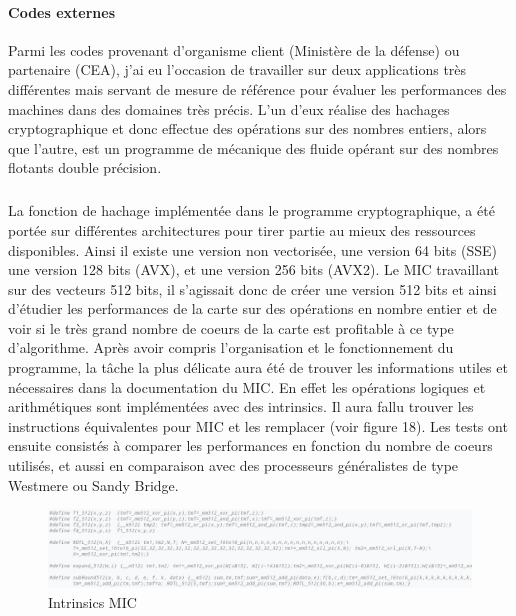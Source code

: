 \documentclass{article}
\begin{document}
				\paragraph{Codes externes}
				Parmi les codes provenant d'organisme client (Ministère de la défense) ou partenaire (CEA), j'ai eu l'occasion 
				de travailler sur deux applications très différentes mais servant de mesure de référence pour évaluer les 
				performances des machines dans des domaines très précis. L'un d'eux réalise des hachages cryptographique et donc
				effectue des opérations sur des nombres entiers, alors que l'autre, est un programme de mécanique des fluide 
				opérant sur des nombres flotants double précision.
					\subparagraph{}
					La fonction de hachage implémentée dans le programme cryptographique, a été portée sur différentes architectures 
					pour tirer partie au mieux des ressources disponibles. Ainsi il existe une version non vectorisée, une version 64 bits (SSE) 
					une version 128 bits (AVX), et une version 256 bits (AVX2). Le MIC travaillant sur des vecteurs 512 bits, 
					il s'agissait donc de créer une version 512 bits et ainsi d'étudier les performances de la carte sur des 
					opérations en nombre entier et de voir si le très grand nombre de coeurs de la carte est profitable à ce 
					type d'algorithme. \newline
					Après avoir compris l'organisation et le fonctionnement du programme, la tâche la plus délicate aura été
					de trouver les informations utiles et nécessaires dans la documentation du MIC. En effet les opérations 
					logiques et arithmétiques sont implémentées avec des intrinsics. Il aura fallu trouver les instructions 
					équivalentes pour MIC et les remplacer (voir figure 18). \newline
					Les tests ont ensuite consistés à comparer les performances en fonction du nombre de coeurs utilisés, et 
					aussi en comparaison avec des processeurs généralistes de type Westmere ou Sandy Bridge.
					\begin{figure}
					\begin{center}
					\includegraphics[scale=0.5]{intrinsics.png}
					\caption{Intrinsics MIC}
					\end{center}
					\end{figure}
\end{document}
